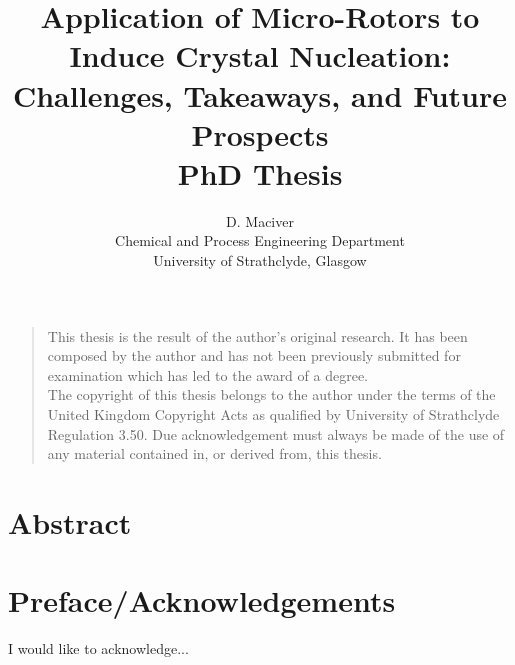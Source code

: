 \documentclass[a4paper,oneside,11pt]{book}
\title{Application of Micro-Rotors to Induce Crystal Nucleation: 
	   Challenges, Takeaways, and Future Prospects\\ PhD Thesis}
\author{D. Maciver\\[-0.8ex]
\small Chemical and Process Engineering Department\\[-0.8ex]
\small University of Strathclyde, Glasgow\\}
\begin{document}
\maketitle


\frontmatter

\vspace*{\fill}
\noindent
\begin{quote}
	\centering
	This thesis is the result of the author's original research. It has been composed by the author and has not been previously submitted for examination which has led to the award of a degree. \\[5pt]
	The copyright of this thesis belongs to the author under the terms of the United Kingdom Copyright Acts as qualified by University of Strathclyde Regulation 3.50. Due acknowledgement must always be made of the use of any material contained in, or derived from, this thesis. \\[5pt]
\end{quote}
\vspace*{\fill}



\chapter{Abstract}



\tableofcontents

\listoffigures

\listoftables



\chapter{Preface/Acknowledgements}
I would like to acknowledge... 



\mainmatter







\end{document}

